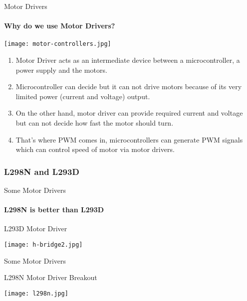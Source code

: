 \documentclass{beamer}
\begin{document}
	\begin{frame}{Motor Drivers}
	
		\framesubtitle{Why do we use Motor Drivers?}
		
			\texttt{[image: motor-controllers.jpg]}
			
			
			\begin{enumerate}
			
				\item{Motor Driver acts as an intermediate device between a microcontroller, a power supply and the motors.}
				
				\item{Microcontroller can decide but it can not drive motors because of its very limited power (current and voltage) output.}
				
				\item{On the other hand, motor driver can provide required current and voltage but can not decide how fast the motor should turn.}
				
				\item{That's where PWM comes in, microcontrollers can generate PWM signals which can control speed of motor via motor drivers.}			
			
			\end{enumerate}
		
		
			
	
	
	\end{frame}
	
	\subsubsection{L298N and L293D}
	
	
	
	\begin{frame}{Some Motor Drivers}
		
		\framesubtitle{L298N is better than L293D}
		
		\begin{alertblock}{L293D Motor Driver}
		
			\texttt{[image: h-bridge2.jpg]}
		
		\end{alertblock}
		
	\end{frame}
	
	
	\begin{frame}{Some Motor Drivers}
		
		\begin{alertblock}{L298N Motor Driver Breakout}
		
			\texttt{[image: l298n.jpg]}
		
		\end{alertblock}
	
	\end{frame}
	
\end{document}
